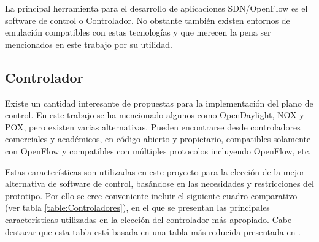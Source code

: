 La principal herramienta para el desarrollo de aplicaciones SDN/OpenFlow es el software de control o Controlador. No obstante también existen entornos de emulación compatibles con estas tecnologías y que merecen la pena ser mencionados en este trabajo por su utilidad.

\subsection{Controlador}
Existe un cantidad interesante de propuestas para la implementaci\'on del plano de control. En este trabajo se ha mencionado algunos como OpenDaylight, NOX y POX, pero existen varias alternativas. Pueden encontrarse desde controladores comerciales y académicos, en código abierto y propietario, compatibles solamente con OpenFlow y compatibles con múltiples protocolos incluyendo OpenFlow, etc.

Estas características son utilizadas en este proyecto para la elección de la mejor alternativa de software de control, basándose en las necesidades y restricciones del prototipo. Por ello se cree conveniente incluir el siguiente cuadro comparativo (ver tabla \ref{table:Controladores}), en el que se presentan las principales características utilizadas en la elecci\'on del controlador m\'as apropiado. Cabe destacar que esta tabla est\'a basada en una tabla m\'as reducida presentada en \cite{StateOfArt1}.

